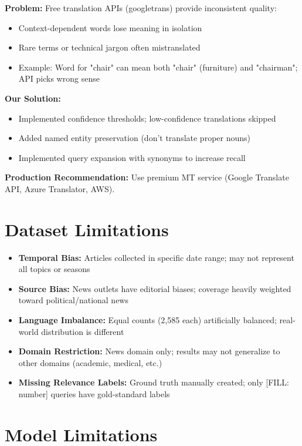 \documentclass[12pt,a4paper]{report}
\begin{document}
\textbf{Problem:} Free translation APIs (googletrans) provide inconsistent quality:
\begin{itemize}
    \item Context-dependent words lose meaning in isolation
    \item Rare terms or technical jargon often mistranslated
    \item Example: Word for "chair" can mean both "chair" (furniture) and "chairman"; API picks wrong sense
\end{itemize}

\textbf{Our Solution:}
\begin{itemize}
    \item Implemented confidence thresholds; low-confidence translations skipped
    \item Added named entity preservation (don't translate proper nouns)
    \item Implemented query expansion with synonyms to increase recall
\end{itemize}

\textbf{Production Recommendation:} Use premium MT service (Google Translate API, Azure Translator, AWS).

\section{Dataset Limitations}

\begin{itemize}
    \item \textbf{Temporal Bias:} Articles collected in specific date range; may not represent all topics or seasons
    \item \textbf{Source Bias:} News outlets have editorial biases; coverage heavily weighted toward political/national news
    \item \textbf{Language Imbalance:} Equal counts (2,585 each) artificially balanced; real-world distribution is different
    \item \textbf{Domain Restriction:} News domain only; results may not generalize to other domains (academic, medical, etc.)
    \item \textbf{Missing Relevance Labels:} Ground truth manually created; only [FILL: number] queries have gold-standard labels
\end{itemize}

\section{Model Limitations}
\end{document}
